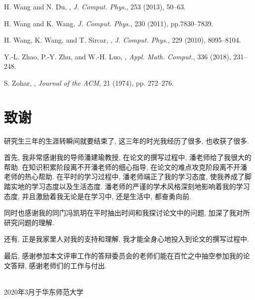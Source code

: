 \documentclass{ecnumaster}
\begin{document}
\begin{thebibliography}{99}
\newblock H. Wang and N. Du,
,
\newblock \emph{J. Comput. Phys.}, 253 (2013), 50--63.

\newblock H. Wang and K. Wang,
\newblock \emph{J. Comput. Phys.}, 230 (2011), pp.7830--7839.

\newblock H. Wang, K. Wang, and T. Sircar,
,
\newblock \emph{J. Comput. Phys.}, 229 (2010), 8095--8104.



\newblock Y.-L. Zhao, P.-Y. Zhu, and W.-H. Luo,
,
\newblock \emph{Appl. Math. Comput.},  336 (2018), 231--248.

\newblock S. Zohar,
,
\newblock \emph{Journal of the ACM}, 21 (1974), pp. 272--276.




\end{thebibliography}


\clearpage{\pagestyle{empty}\cleardoublepage}
\linespread{1.4}\selectfont

\clearpage{\pagestyle{empty}\cleardoublepage}
\chapter*{致谢}
研究生三年的生涯转瞬间就要结束了, 这三年的时光我经历了很多, 也收获了很多.

首先, 我非常感谢我的导师潘建瑜教授, 在论文的撰写过程中, 潘老师给了我很大的帮助. 在知识积累阶段离不开潘老师的细心指导, 在论文的难点攻克阶段离不开潘老师的热心帮助. 在平时的学习过程中, 潘老师端正了我的学习态度, 使我养成了脚踏实地的学习态度以及生活态度. 潘老师的严谨的学术风格深刻地影响着我的学习态度, 并且激励着我无论是在学习中, 还是生活中, 都奋勇向前.

同时也感谢我的同门冯凯玥在平时抽出时间和我探讨论文中的问题, 加深了我对所研究问题的理解.

还有, 正是我家里人对我的支持和理解, 我才能全身心地投入到论文的撰写过程中.

最后, 感谢参加本文评审工作的答辩委员会的老师们能在百忙之中抽空参加我的论文答辩, 感谢老师们的工作与付出.
\bigskip\bigskip

\mbox{}\hfill{}\\
\mbox{}\hfill 2020年3月于华东师范大学
\end{document}
